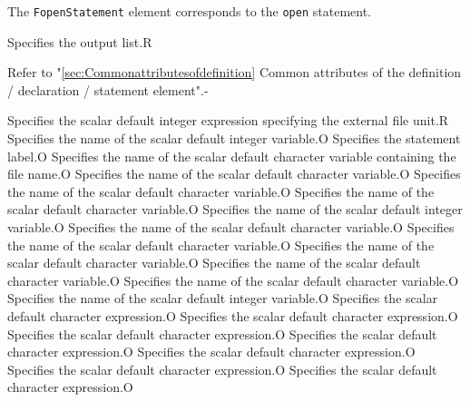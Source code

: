 The {\tt FopenStatement} element corresponds to the {\tt open} statement.


\begin{XcodeMLChildElements}
{Specifies the output list.}{R}
\end{XcodeMLChildElements}

\begin{XcodeMLAttributes}
{Refer to "\ref{sec:Commonattributesofdefinition} Common attributes of the definition / declaration / statement element".}{-}
\end{XcodeMLAttributes}

\begin{XcodeMLControlList}
{Specifies the scalar default integer expression specifying the external file unit.}{R}
{Specifies the name of the scalar default integer variable.}{O}
{Specifies the statement label.}{O}
{Specifies the name of the scalar default character variable containing the file name.}{O}
{Specifies the name of the scalar default character variable.}{O}
{Specifies the name of the scalar default character variable.}{O}
{Specifies the name of the scalar default character variable.}{O}
{Specifies the name of the scalar default integer variable.}{O}
{Specifies the name of the scalar default character variable.}{O}
{Specifies the name of the scalar default character variable.}{O}
{Specifies the name of the scalar default character variable.}{O}
{Specifies the name of the scalar default character variable.}{O}
{Specifies the name of the scalar default character variable.}{O}
{Specifies the name of the scalar default integer variable.}{O}
{Specifies the scalar default character expression.}{O}
{Specifies the scalar default character expression.}{O}
{Specifies the scalar default character expression.}{O}
{Specifies the scalar default character expression.}{O}
{Specifies the scalar default character expression.}{O}
{Specifies the scalar default character expression.}{O}
{Specifies the scalar default character expression.}{O}
\end{XcodeMLControlList}


